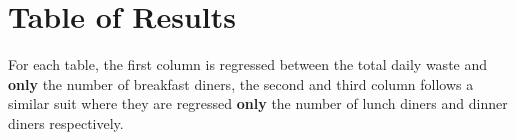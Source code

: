 \section{Table of Results}



For each table, the first column is regressed between the total daily waste and \textbf{only} the number of breakfast diners, the second and third column follows a similar suit where they are regressed \textbf{only} the number of lunch diners and dinner diners respectively.
